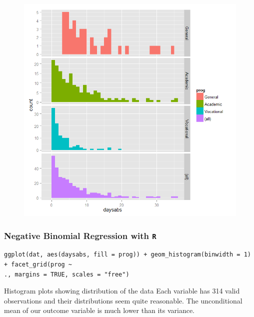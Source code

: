 \documentclass[00-GLMregslides.tex]{subfiles}
\begin{document}
\begin{frame}
\begin{figure}
\centering
\includegraphics[width=0.99\linewidth]{negbin1}
\end{figure}

\end{frame}
\begin{frame}[fragile]
	\frametitle{Negative Binomial Regression with \texttt{R} }
	\Large

\begin{verbatim}	
ggplot(dat, aes(daysabs, fill = prog)) + geom_histogram(binwidth = 1) + facet_grid(prog ~ 
., margins = TRUE, scales = "free")
\end{verbatim}
Histogram plots showing distribution of the data
Each variable has 314 valid observations and their distributions seem quite reasonable. The unconditional mean of our outcome variable is much lower than its variance.
\end{frame}
\end{document}
